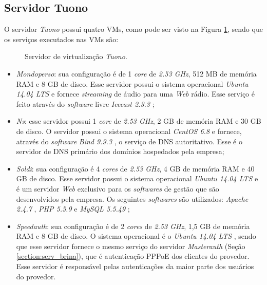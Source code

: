 \subsection{Servidor Tuono}
\label{section:serv_tuono}

O servidor \textit{Tuono} possui quatro \acp{VM}, como pode ser visto na Figura \ref{fig:servidor_tuono}, sendo que os serviços executados nas 
\acp{VM} são:

\begin{figure}[h!]
 \centering
 \caption{Servidor de virtualização \textit{Tuono}.}
 \label{fig:servidor_tuono}
\end{figure}

\begin{itemize}
 \item \textit{Mondoperso}: sua configuração é de 1 \textit{core} de \textit{2.53 GHz}, 512 MB de memória \ac{RAM} e 8 GB de disco. 
 Esse servidor possui o sistema operacional \textit{Ubuntu 14.04 \ac{LTS}} \cite{ubuntu} e fornece \textit{streaming} de áudio para uma 
 \textit{Web} rádio. Esse serviço é feito através do \textit{software} livre \textit{Icecast 2.3.3} \cite{icecast};
 
 \item \textit{Ns}: esse servidor possui 1 \textit{core} de \textit{2.53 GHz}, 2 GB de memória \ac{RAM} e 30 GB de disco. O servidor possui o sistema 
 operacional \textit{CentOS 6.8} \cite{centos} e fornece, através do \textit{software} \textit{Bind 9.9.3} \cite{bind}, o serviço de \ac{DNS} 
 autoritativo. Esse é o servidor de \ac{DNS} primário dos domínios hospedados pela empresa;

 \item \textit{Soldi}: sua configuração é 4 \textit{cores} de \textit{2.53 GHz}, 4 GB de memória \ac{RAM} e 40 GB de disco. 
 Esse servidor possui o sistema operacional \textit{Ubuntu 14.04 \ac{LTS}} \cite{ubuntu} e é um servidor \textit{Web} exclusivo para os
 \textit{softwares} de gestão que são desenvolvidos pela empresa. Os seguintes \textit{softwares} são utilizados: \textit{Apache 2.4.7} 
 \cite{apache}, \textit{\ac{PHP} 5.5.9} \cite{php} e \textit{MySQL 5.5.49} \cite{mysql};

 \item \textit{Speedauth}: sua configuração é de 2 \textit{cores} de \textit{2.53 GHz}, 1,5 GB de memória \ac{RAM} e 8 GB de disco. 
 O sistema operacional é o \textit{Ubuntu 14.04 \ac{LTS}} \cite{ubuntu}, sendo que esse servidor fornece o mesmo serviço do servidor 
 \textit{Masterauth} (Seção \ref{section:serv_brina}), que é autenticação \ac{PPPoE} dos clientes do provedor. Esse servidor é responsável pelas 
 autenticações da maior parte dos usuários do provedor.
\end{itemize}

